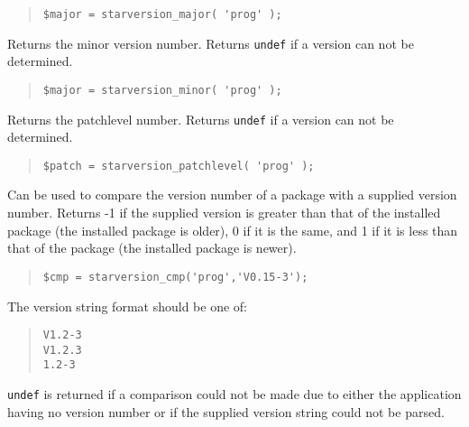 \documentclass[twoside,11pt]{article}
\newenvironment{myquote}{\begin{quote}\begin{small}}{\end{small}\end{quote}}
\renewcommand{\_}{\texttt{\symbol{95}}}
\begin{document}
\begin{description}
\begin{myquote}
\begin{verbatim}
$major = starversion_major( 'prog' );
\end{verbatim} 
\end{myquote} %

\item[starversion\_minor] \mbox{}

Returns the minor version number. Returns \texttt{undef} if a version
can not be determined.

\begin{myquote}
\begin{verbatim}
$major = starversion_minor( 'prog' );
\end{verbatim} 
\end{myquote} %

\item[starversion\_patchlevel] \mbox{}

Returns the patchlevel number. Returns \texttt{undef} if a version
can not be determined.

\begin{myquote}
\begin{verbatim}
$patch = starversion_patchlevel( 'prog' );
\end{verbatim} 
\end{myquote} %

\item[starversion\_cmp] \mbox{}
  
  Can be used to compare the version number of a package with a supplied
  version number. Returns -1 if the supplied version is greater than that of
  the installed package (the installed package is older), 0 if it is the same,
  and 1 if it is less than that of the package (the installed package is
  newer).

\begin{myquote}
\begin{verbatim}
$cmp = starversion_cmp('prog','V0.15-3');
\end{verbatim}
\end{myquote} %

The version string format should be one of:

\begin{myquote}
\begin{verbatim}
V1.2-3
V1.2.3
1.2-3
\end{verbatim}
\end{myquote}

\texttt{undef} is returned if a comparison could not be made due to
either the application having no version number or if the 
supplied version string could not be parsed.




\end{description}
\end{document}
